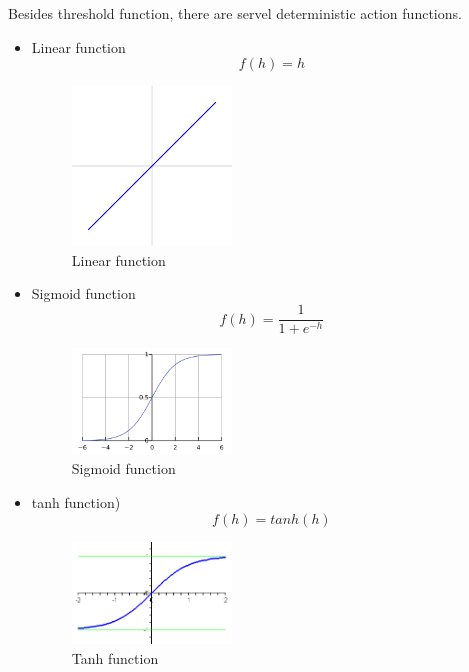 Besides threshold function, there are servel deterministic action functions.
\begin{itemize}
  \item Linear function 
\begin{equation}\label{eq:LinearFunc}
f(h) = h
\end{equation}

\graphicspath{ {./Figures/} }
\begin{figure}[!htb]
\centering
\includegraphics[width=0.4\textwidth]{Linear_function.png}
\caption{\label{fig:1LayerErrorSurface}Linear function}
\end{figure}
  
  \item Sigmoid function
\begin{equation}\label{eq:SigmoidFunc}
f(h) = \frac{1}{1+e^{-h}}
\end{equation}

\graphicspath{ {./Figures/} }
\begin{figure}[!htb]
\centering
\includegraphics[width=0.4\textwidth]{Logistic-curve.png}
\caption{\label{fig:1LayerErrorSurface}Sigmoid function}
\end{figure}

  \item tanh function)
\begin{equation}\label{eq:TanhFunc}
f(h) = tanh(h)
\end{equation}

\graphicspath{ {./Figures/} }
\begin{figure}[!htb]
\centering
\includegraphics[width=0.4\textwidth]{tanh.png}
\caption{\label{fig:1LayerErrorSurface}Tanh function}
\end{figure}
\end{itemize}

